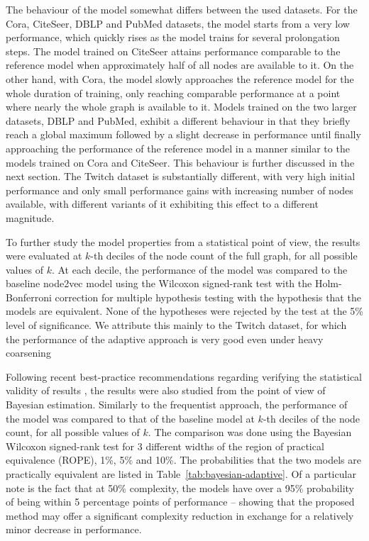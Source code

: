 \documentclass[sn-mathphys,pdflatex,iicol]{sn-jnl}%
\begin{document}
The behaviour of the model somewhat differs between the used datasets. For the Cora, CiteSeer, DBLP and PubMed datasets, the model starts from a very low performance, which quickly rises as the model trains for several prolongation steps. The model trained on CiteSeer attains performance comparable to the reference model when approximately half of all nodes are available to it. On the other hand, with Cora, the model slowly approaches the reference model for the whole duration of training, only reaching comparable performance at a point where nearly the whole graph is available to it. Models trained on the two larger datasets, DBLP and PubMed, exhibit a different behaviour in that they briefly reach a global maximum followed by a slight decrease in performance until finally approaching the performance of the reference model in a manner similar to the models trained on Cora and CiteSeer. This behaviour is further discussed in the next section. The Twitch dataset is substantially different, with very high initial performance and only small performance gains with increasing number of nodes available, with different variants of it exhibiting this effect to a different magnitude.

To further study the model properties from a statistical point of view, the results were evaluated at \( k \)-th deciles of the node count of the full graph, for all possible values of \( k \). At each decile, the performance of the model was compared to the baseline node2vec model using the Wilcoxon signed-rank test with the Holm-Bonferroni correction for multiple hypothesis testing with the hypothesis that the models are equivalent. None of the hypotheses were rejected by the test at the 5\% level of significance. We attribute this mainly to the Twitch dataset, for which the performance of the adaptive approach is very good even under heavy coarsening

Following recent best-practice recommendations regarding verifying the statistical validity of results \cite{benavoli_time_2017}, the results were also studied from the point of view of Bayesian estimation. Similarly to the frequentist approach, the performance of the model was compared to that of the baseline model at \( k \)-th deciles of the node count, for all possible values of \( k \). The comparison was done using the Bayesian Wilcoxon signed-rank test \cite{benavoli_bayesian_2014} for 3 different widths of the region of practical equivalence (ROPE), 1\%, 5\% and 10\%. The probabilities that the two models are practically equivalent are listed in Table~\ref{tab:bayesian-adaptive}. Of a particular note is the fact that at 50\% complexity, the models have over a 95\% probability of being within 5 percentage points of performance -- showing that the proposed method may offer a significant complexity reduction in exchange for a relatively minor decrease in performance.
\end{document}
